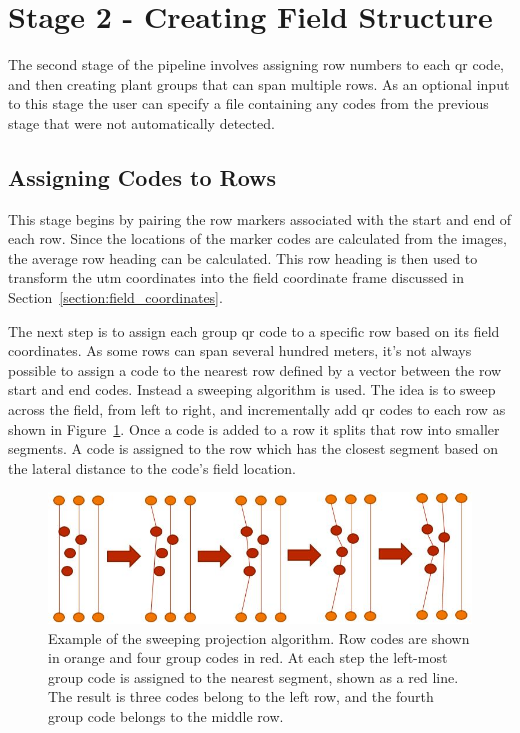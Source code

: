 \section{Stage 2 - Creating Field Structure}
\label{processing-stage2}

The second stage of the pipeline involves assigning row numbers to each \ac{qr} code, and then creating plant groups that can span multiple rows.  As an optional input to this stage the user can specify a file containing any codes from the previous stage that were not automatically detected.  

\subsection{Assigning Codes to Rows}

This stage begins by pairing the row markers associated with the start and end of each row.  Since the locations of the marker codes are calculated from the images, the average row heading can be calculated.  This row heading is then used to transform the \ac{utm} coordinates into the field coordinate frame discussed in Section~\ref{section:field_coordinates}.

The next step is to assign each group \ac{qr} code to a specific row based on its field coordinates.  As some rows can span several hundred meters, it's not always possible to assign a code to the nearest row defined by a vector between the row start and end codes.  Instead a sweeping algorithm is used.   The idea is to sweep across the field, from left to right, and incrementally add \ac{qr} codes to each row as shown in Figure~\ref{figure:sweeping_algorithm}. Once a code is added to a row it splits that row into smaller segments.  A code is assigned to the row which has the closest segment based on the lateral distance to the code's field location. 

\begin{figure}
	\centering
    \includegraphics[width=6in]{figures/sweeping_algorithm.jpg}
    \caption[Sweeping projection algorithm]{Example of the sweeping projection algorithm. Row codes are shown in orange and four group codes in red.  At each step the left-most group code is assigned to the nearest segment, shown as a red line.  The result is three codes belong to the left row, and the fourth group code belongs to the middle row.}
    \label{figure:sweeping_algorithm}
\end{figure}

